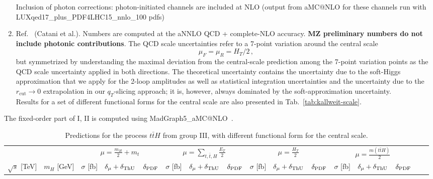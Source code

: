 \documentclass[a4paper,usenames,dvipsnames,11pt]{article}
\begin{document}
\begin{enumerate}[I:]
Inclusion of photon corrections: photon-initiated channels are included at NLO (output from aMC@NLO for these channels run with LUXqed17\_plus\_PDF4LHC15\_nnlo\_100 pdfs)
    \item Ref.~\cite{Catani:2022mfv} (Catani et al.). Numbers are computed at the aNNLO QCD + complete-NLO accuracy. {\bf MZ preliminary numbers
            do not include photonic contributions}.
             The QCD scale uncertainties refer to a 7-point variation around the central scale 
             \begin{equation}
                  \mu_F=\mu_R=H_T/2\,,
             \end{equation} 
             but symmetrized by understanding the maximal deviation from the central-scale prediction among the 7-point variation points 
             as the QCD scale uncertainty applied in both directions. The theoretical uncertainty contains the uncertainty due to the 
             soft-Higgs approximation that we apply for the 2-loop amplitudes as well as statistical integration uncertainties 
             and the uncertainty due to the $r_{\textrm{cut}}\to 0$ extrapolation in our $q_T$-slicing approach; it is, however, 
             always dominated by the soft-approximation uncertainty.\\
             Results for a set of different functional forms for the central scale are also presented in Tab.~\ref{tab:kallweit-scale}.
\end{enumerate}
The fixed-order part of I, II is computed using {\sc MadGraph5\_aMC@NLO}~\cite{Alwall:2014hca,Frederix:2018nkq}.

\begin{landscape}
\begin{table}
    \centering
    \begin{tabular}{cc|ccc|ccc|ccc|ccc|cc}
         & & \multicolumn{3}{c}{$\mu=\frac{m_H}{2}+m_t$}  & 
                                            \multicolumn{3}{c}{$\mu=\sum_{t,\bar t,H}\frac{E_T}{2}$}  &    
                                            \multicolumn{3}{c}{$\mu=\frac{H_T}{2} $} &    
                                            \multicolumn{3}{c}{$\mu=\frac{m(t\bar t H)}{2} $}\\
        $\sqrt{s}$ [TeV]  &  $m_H$ [GeV]  &
        $\sigma$ [fb] & $\delta_{\mu} + \delta_{\rm ThU}$ & $\delta_{\rm PDF}$ &
        $\sigma$ [fb] & $\delta_{\mu} + \delta_{\rm ThU}$ & $\delta_{\rm PDF}$ &
        $\sigma$ [fb] & $\delta_{\mu} + \delta_{\rm ThU}$ & $\delta_{\rm PDF}$ &
        $\sigma$ [fb] & $\delta_{\mu} + \delta_{\rm ThU}$ & $\delta_{\rm PDF}$ 
        \\
        \hline
          
    \end{tabular}
    \caption{\label{tab:tth} Predictions for the process $t \bar t H$ from group III, with different functional form for the central scale.}
\end{table}
\end{landscape}
\end{document}
